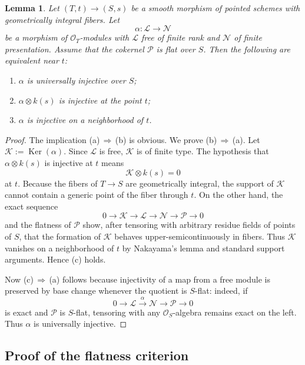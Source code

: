 \documentclass[11pt,oneside]{article}
\newtheorem{lemma}[theorem]{Lemma}
\newcommand{\Lcal}{\mathcal L}
\newcommand{\N}{\mathcal N}
\newcommand{\Pcal}{\mathcal P}
\newcommand{\OO}{\mathcal O}
\newcommand{\Kcal}{\mathcal K}
\newcommand{\Ker}{\operatorname{Ker}}
\begin{document}
\begin{lemma}\label{lem:ui-smooth}
Let $(T,t)\to(S,s)$ be a smooth morphism of pointed schemes with geometrically integral fibers.  Let
\[
\alpha\colon \Lcal\to \N
\]
be a morphism of $\OO_T$-modules with $\Lcal$ free of finite rank and $\N$ of finite presentation.  Assume that the cokernel $\Pcal$ is flat over $S$.  Then the following are equivalent near $t$:
\begin{enumerate}[label=\textup{(\alph*)}]
  \item $\alpha$ is universally injective over $S$;
  \item $\alpha\otimes k(s)$ is injective at the point $t$;
  \item $\alpha$ is injective on a neighborhood of $t$.
\end{enumerate}
\end{lemma}

\begin{proof}
The implication \textup{(a)}\,$\Rightarrow$\,\textup{(b)} is obvious.  We prove \textup{(b)}\,$\Rightarrow$\,\textup{(a)}.  Let $\Kcal:=\Ker(\alpha)$.  Since $\Lcal$ is free, $\Kcal$ is of finite type.  The hypothesis that $\alpha\otimes k(s)$ is injective at $t$ means
\[
\Kcal\otimes k(s)=0
\]
at $t$.  Because the fibers of $T\to S$ are geometrically integral, the support of $\Kcal$ cannot contain a generic point of the fiber through $t$.  On the other hand, the exact sequence
\[
0\to \Kcal\to \Lcal\to \N\to \Pcal\to 0
\]
and the flatness of $\Pcal$ show, after tensoring with arbitrary residue fields of points of $S$, that the formation of $\Kcal$ behaves upper-semicontinuously in fibers.  Thus $\Kcal$ vanishes on a neighborhood of $t$ by Nakayama's lemma and standard support arguments.  Hence \textup{(c)} holds.

Now \textup{(c)}\,$\Rightarrow$\,\textup{(a)} follows because injectivity of a map from a free module is preserved by base change whenever the quotient is $S$-flat: indeed, if
\[
0\to \Lcal\xrightarrow{\alpha}\N\to \Pcal\to 0
\]
is exact and $\Pcal$ is $S$-flat, tensoring with any $\OO_S$-algebra remains exact on the left.  Thus $\alpha$ is universally injective.
\end{proof}

\subsection{Proof of the flatness criterion}
\end{document}
